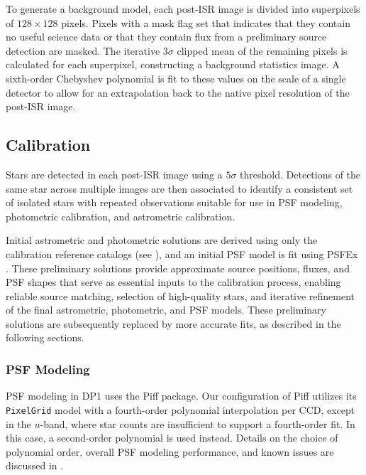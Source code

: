 To generate a \gls{background} model, each post-ISR image is divided into superpixels of $128\times128$ pixels.
Pixels with a mask flag set that indicates that they contain no useful science data or that they contain \gls{flux} from a preliminary source detection are masked.
The iterative $3\sigma$ clipped mean of the remaining pixels is calculated for each superpixel, constructing a \gls{background} statistics image.
A sixth-order Chebyshev polynomial is fit to these values on the scale of a single detector to allow for an extrapolation back to the native pixel resolution of the post-\gls{ISR} image.

\subsection{Calibration}
\label{ssec:drp_calibration}
Stars are detected in each post-\gls{ISR} image using a $5\sigma$ threshold.
Detections of the same star across multiple images are then associated to identify a consistent set of isolated stars with repeated observations suitable for use in PSF modeling, photometric \gls{calibration}, and astrometric \gls{calibration}.

Initial astrometric and photometric solutions are derived using only the calibration reference catalogs (see ), and an initial \gls{PSF} model is fit using PSFEx \citep{2011ASPC..442..435B}.
These preliminary solutions provide approximate source positions, fluxes, and \gls{PSF} shapes that serve as essential inputs to the \gls{calibration} process, enabling reliable source matching, selection of high-quality stars, and iterative refinement of the final astrometric, photometric, and \gls{PSF} models.
These preliminary solutions are subsequently replaced by more accurate fits, as described in the following sections.

\subsubsection{PSF Modeling}
\label{ssec:psf_modelling}
\gls{PSF} modeling in \gls{DP1} uses the Piff \citep{DES:2020vau} package.
Our configuration of Piff utilizes its \texttt{PixelGrid} model with a fourth-order polynomial interpolation per \gls{CCD}, except in the $u$-band, where star counts are insufficient to support a fourth-order fit.
In this case, a second-order polynomial is used instead.
Details on the choice of polynomial order, overall \gls{PSF} modeling performance, and known issues are discussed in .


